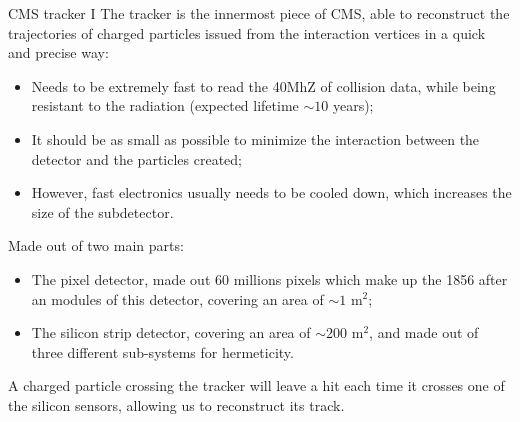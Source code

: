 \documentclass[8pt]{beamer}
\begin{document}
\begin{frame}{CMS tracker I}
\justifying
The tracker is the innermost piece of CMS, able to reconstruct the trajectories of charged particles issued from the interaction vertices in a quick and precise way:
\begin{itemize}
\justifying
\item Needs to be extremely fast to read the 40MhZ of collision data, while being resistant to the radiation (expected lifetime $\sim 10$ years);
\item It should be as small as possible to minimize the interaction between the detector and the particles created;
\item However, fast electronics usually needs to be cooled down, which increases the size of the subdetector.
\end{itemize} \vfill

Made out of two main parts: 
\begin{itemize}
\justifying
\item The \alert{pixel detector}, made out 60 millions pixels which make up the 1856 after an modules of this detector, covering an area of $\sim 1$ m$^2$;
\item The \alert{silicon strip detector}, covering an area of $\sim 200$ m$^2$, and made out of three different sub-systems for hermeticity.
\end{itemize} \vfill

A charged particle crossing the tracker will leave a hit each time it crosses one of the silicon sensors, allowing us to reconstruct its track. \vfill
\end{frame}
\end{document}
